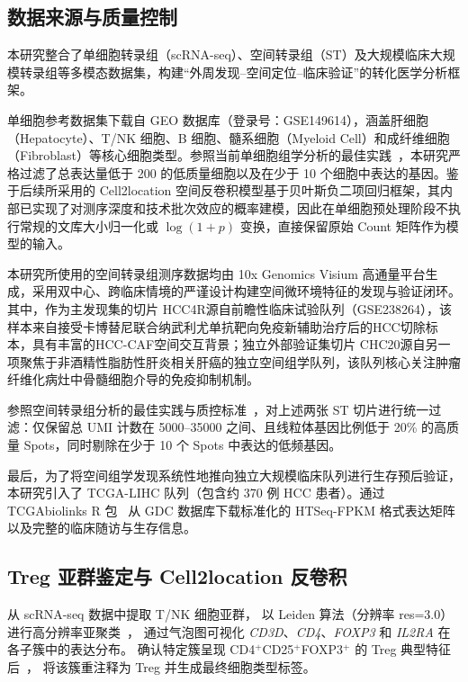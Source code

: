 \documentclass[12pt, a4paper]{ctexart}
\begin{document}
\subsection{数据来源与质量控制}

本研究整合了单细胞转录组（scRNA-seq）、空间转录组（ST）及大规模临床大规模转录组等多模态数据集，构建``外周发现--空间定位--临床验证”的转化医学分析框架。

单细胞参考数据集下载自 GEO 数据库（登录号：GSE149614），涵盖肝细胞（Hepatocyte）、T/NK 细胞、B 细胞、髓系细胞（Myeloid Cell）和成纤维细胞（Fibroblast）等核心细胞类型。参照当前单细胞组学分析的最佳实践~\citep{luecken2019current}，本研究严格过滤了总表达量低于 200 的低质量细胞以及在少于 10 个细胞中表达的基因。鉴于后续所采用的 Cell2location 空间反卷积模型基于贝叶斯负二项回归框架，其内部已实现了对测序深度和技术批次效应的概率建模，因此在单细胞预处理阶段不执行常规的文库大小归一化或 $\log(1+p)$ 变换，直接保留原始 Count 矩阵作为模型的输入。

本研究所使用的空间转录组测序数据均由 10x Genomics Visium 高通量平台生成，采用双中心、跨临床情境的严谨设计构建空间微环境特征的发现与验证闭环。其中，作为主发现集的切片 HCC4R源自前瞻性临床试验队列（GSE238264），该样本来自接受卡博替尼联合纳武利尤单抗靶向免疫新辅助治疗后的HCC切除标本，具有丰富的HCC-CAF空间交互背景；独立外部验证集切片 CHC20源自另一项聚焦于非酒精性脂肪性肝炎相关肝癌的独立空间组学队列，该队列核心关注肿瘤纤维化病灶中骨髓细胞介导的免疫抑制机制。

参照空间转录组分析的最佳实践与质控标准~\citep{williams2022introduction,palla2022squidpy}，对上述两张 ST 切片进行统一过滤：仅保留总 UMI 计数在 5000--35000 之间、且线粒体基因比例低于 20\% 的高质量 Spots，同时剔除在少于 10 个 Spots 中表达的低频基因。

最后，为了将空间组学发现系统性地推向独立大规模临床队列进行生存预后验证，本研究引入了 TCGA-LIHC 队列（包含约 370 例 HCC 患者）。通过 TCGAbiolinks R 包~\citep{colaprico2016tcgabiolinks} 从 GDC 数据库下载标准化的 HTSeq-FPKM 格式表达矩阵以及完整的临床随访与生存信息。

\subsection{Treg 亚群鉴定与 Cell2location 反卷积}

从 scRNA-seq 数据中提取 T/NK 细胞亚群，
以 Leiden 算法（分辨率 res=3.0）进行高分辨率亚聚类~\citep{traag2019leiden}，
通过气泡图可视化 \textit{CD3D}、\textit{CD4}、\textit{FOXP3} 和 \textit{IL2RA} 在各子簇中的表达分布。
确认特定簇呈现 CD4$^+$CD25$^+$FOXP3$^+$ 的 Treg 典型特征后~\citep{sakaguchi2020regulatory}，
将该簇重注释为 Treg 并生成最终细胞类型标签。
\end{document}
